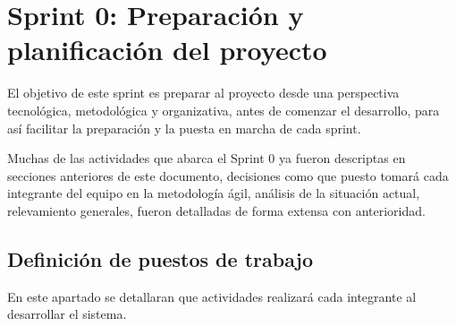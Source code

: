 \section{Sprint 0: Preparación y planificación del proyecto}
El objetivo de este sprint es preparar al proyecto desde una perspectiva tecnológica, metodológica y organizativa, antes de comenzar el desarrollo, para así facilitar la preparación y la puesta en marcha de cada sprint.

Muchas de las actividades que abarca el Sprint 0 ya fueron descriptas en secciones anteriores de este documento, decisiones como que puesto tomará cada integrante del equipo en la metodología ágil, análisis de la situación actual, relevamiento generales, fueron detalladas de forma extensa con anterioridad.

\subsection{Definición de puestos de trabajo}
En este apartado se detallaran que actividades realizará cada integrante al desarrollar el sistema.

\begin{table}[h]
\begin{center}
\caption{Equipo de trabajo}
\label{equipoDeTrabajo}
\end{center}
\end{table}



